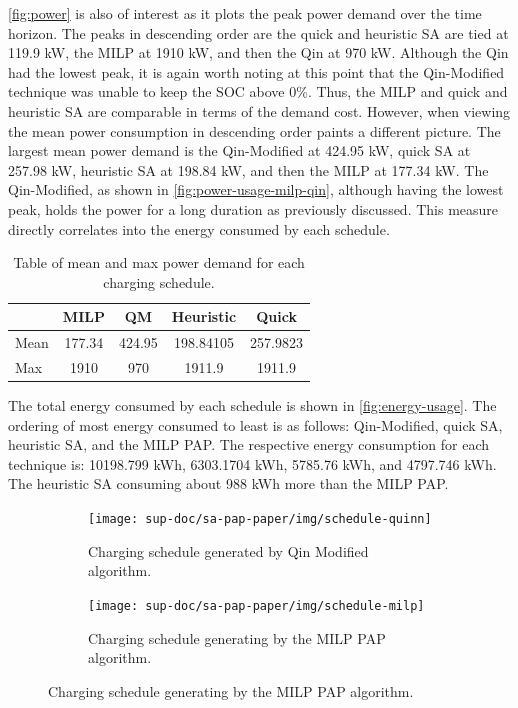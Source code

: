\documentclass[ee,thesis]{usuthesis}
\begin{document}
\ref{fig:power} is also of interest as it plots the peak power demand over the time horizon. The peaks in descending
order are the quick and heuristic SA are tied at 119.9 kW, the MILP at 1910 kW, and then the Qin at 970 kW. Although the
Qin had the lowest peak, it is again worth noting at this point that the Qin-Modified technique was unable to keep the
SOC above 0\%. Thus, the MILP and quick and heuristic SA are comparable in terms of the demand cost. However, when
viewing the mean power consumption in descending order paints a different picture. The largest mean power demand is the
Qin-Modified at 424.95 kW, quick SA at 257.98 kW, heuristic SA at 198.84 kW, and then the MILP at 177.34 kW. The
Qin-Modified, as shown in \ref{fig:power-usage-milp-qin}, although having the lowest peak, holds the power for a long
duration as previously discussed. This measure directly correlates into the energy consumed by each schedule.

\begin{table}[htbp]
\caption{\label{tab:power}Table of mean and max power demand for each charging schedule.}
\centering
\begin{tabular}{|l|cccc|}
\hline
 & MILP & QM & Heuristic & Quick\\[0pt]
\hline
Mean & 177.34 & 424.95 & 198.84105 & 257.9823\\[0pt]
Max & 1910 & 970 & 1911.9 & 1911.9\\[0pt]
\hline
\end{tabular}
\end{table}

The total energy consumed by each schedule is shown in \ref{fig:energy-usage}. The ordering of most energy consumed to
least is as follows: Qin-Modified, quick SA, heuristic SA, and the MILP PAP. The respective energy consumption for each
technique is: 10198.799 kWh, 6303.1704 kWh, 5785.76 kWh, and 4797.746 kWh. The heuristic SA consuming about 988 kWh more
than the MILP PAP.

\begin{figure}
  \centering
  \begin{subfigure}[t]{\textwidth}
    \centering
    \texttt{[image: sup-doc/sa-pap-paper/img/schedule-quinn]}
    \caption{Charging schedule generated by Qin Modified algorithm.}
    \label{subfig:schedule-qin}
  \end{subfigure}

  \hfill

  \begin{subfigure}[t]{\textwidth}
    \centering
    \texttt{[image: sup-doc/sa-pap-paper/img/schedule-milp]}
    \caption{Charging schedule generating by the MILP PAP algorithm.}
    \label{subfig:schedule-milp}
  \end{subfigure}
\end{figure}
\end{document}
